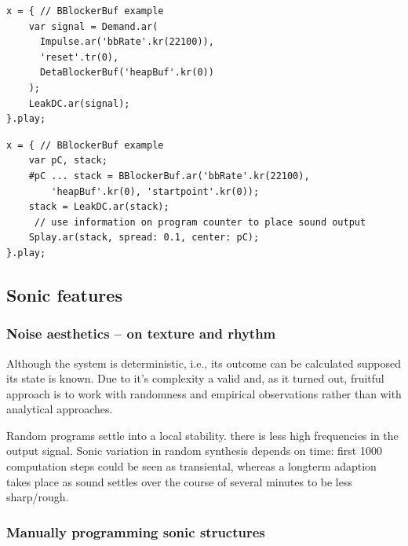\documentclass[letterpaper, 12pt]{article}
\begin{document}
\begin{Verbatim}[fontfamily=courier, xleftmargin=\parindent]
x = { // BBlockerBuf example
	var signal = Demand.ar(
	  Impulse.ar('bbRate'.kr(22100)), 
	  'reset'.tr(0),
	  DetaBlockerBuf('heapBuf'.kr(0))
	);
	LeakDC.ar(signal);
}.play;
\end{Verbatim}

\begin{Verbatim}[fontfamily=courier, xleftmargin=\parindent]
x = { // BBlockerBuf example
	var pC, stack;
	#pC ... stack = BBlockerBuf.ar('bbRate'.kr(22100), 
		'heapBuf'.kr(0), 'startpoint'.kr(0));
	stack = LeakDC.ar(stack);
	 // use information on program counter to place sound output
	Splay.ar(stack, spread: 0.1, center: pC);
}.play;
\end{Verbatim}


\subsection{Sonic features} 
\label{sub:sonic_features}


\subsubsection{Noise aesthetics -- on texture and rhythm} 
\label{sub:noise_aesthetics}

Although the system is deterministic, i.e., its outcome can be calculated supposed its state is known.
Due to it's complexity a valid and, as it turned out, fruitful approach is to work with randomness and empirical observations rather than with analytical approaches.

Random programs settle into a local stability. there is less high frequencies in the output signal. 
Sonic variation in random synthesis depends on time: 
first 1000 computation steps could be seen as transiental, whereas a longterm adaption takes place as sound settles over the course of several minutes to be less sharp/rough.

\subsubsection{Manually programming sonic structures}
\label{sub:manual_programming_sonic_structures}
\end{document}
